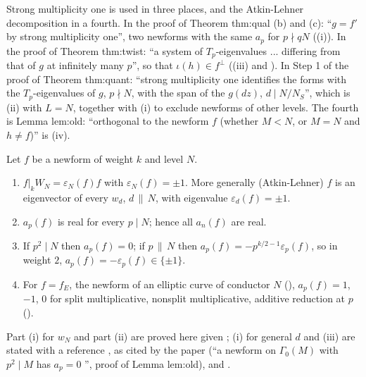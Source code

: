 \begin{paperlink}\label{pl:hecke:smo}
Strong multiplicity one is used in three places, and the Atkin-Lehner decomposition in a fourth. In the proof of Theorem thm:qual (b) and (c): ``$g=f'$ by strong multiplicity one'', two newforms with the same $a_p$ for $p\nmid qN$
((i)). In the proof of Theorem thm:twist: ``a system of $T_p$-eigenvalues ... differing from that of $g$ at infinitely many $p$'', so that $\iota(h)\in f^\perp$
((iii) and ). In Step 1 of the proof of Theorem thm:quant: ``strong multiplicity one identifies the forms with
the $T_p$-eigenvalues of $g$, $p\nmid N$, with the span of the $g(dz)$, $d\mid N/N_S$'', which is (ii) with $L=N$, together with (i) to exclude newforms of
other levels. The fourth is Lemma lem:old: ``orthogonal to the newform $f$ (whether $M<N$, or $M=N$ and $h\ne f$)'' is (iv).
\end{paperlink}

\begin{proposition}\label{prop:hecke:newform-local}
Let $f$ be a newform of weight $k$ and level $N$.
\begin{enumerate}[label=(\roman*)]
\item $f|_kW_N=\varepsilon_N(f)f$ with $\varepsilon_N(f)=\pm1$. More generally (Atkin-Lehner) $f$ is an eigenvector of every $w_d$, $d\,\|\,N$, with eigenvalue $\varepsilon_d(f)=\pm1$.
\item $a_p(f)$ is real for every $p\mid N$; hence all $a_n(f)$ are real.
\item If $p^2\mid N$ then $a_p(f)=0$; if $p\,\|\,N$ then $a_p(f)=-p^{k/2-1}\varepsilon_p(f)$, so in weight $2$, $a_p(f)=-\varepsilon_p(f)\in\{\pm1\}$.
\item For $f=f_E$, the newform of an elliptic curve of conductor $N$ (), $a_p(f)=1$, $-1$, $0$ for split multiplicative, nonsplit multiplicative, additive reduction at
$p$ ().
\end{enumerate}
Part (i) for $w_N$ and part (ii) are proved here given ; (i) for general $d$ and (iii) are stated with a reference \cite{AtkinLehner70}, as cited by the
paper (``a newform on $\Gamma_0(M)$ with $p^2\mid M$ has $a_p=0$ \cite[Theorem 3]{AtkinLehner70}'', proof of Lemma lem:old), and \cite[Sections 5.8, 6.6]{DiamondShurman}.
\end{proposition}

